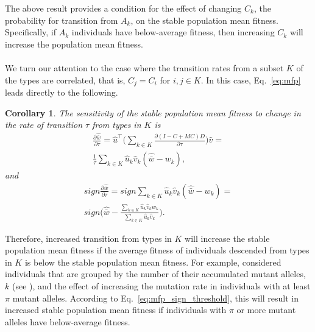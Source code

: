 \documentclass[9pt, a4paper, twocolumn]{extarticle}
\newcommand*{\tr}{^\intercal}
\newtheorem{corollary}{Corollary}
\begin{document}
The above result provides a condition for the effect of changing $C_k$, the probability for transition from $A_k$, on the stable population mean fitness.
Specifically, if $A_k$ individuals have below-average fitness, then increasing $C_k$ will increase the population mean fitness.

\paragraph*{}
We turn our attention to the case where the transition rates from a subset $K$ of the types are correlated, that is, $C_j=C_i$ for $i,j \in K$.
In this case, Eq.~\ref{eq:mfp} leads directly to the following.

\begin{corollary}
The sensitivity of the stable population mean fitness to change in the rate of transition $\tau$ from types in $K$ is
\begin{equation}\label{eq:mfp_K}
\begin{aligned}
\frac{\partial \hat{\bar w}}{\partial \tau} = 
\hat u\tr \Big( \sum_{k \in K}{\frac{\partial (I - C + MC)D}{\partial \tau}} \Big) \hat v = \\
\frac{1}{\tau} \sum_{k \in K}{\hat u_k \hat v_k (\hat{\bar w} - w_k)},
\end{aligned}
\end{equation}
and
\begin{multline}\label{eq:mfp_sign_threshold}
sign \frac{\partial \hat{\bar w}}{\partial \tau} = 
sign \sum_{k \in K}{\hat u_k \hat v_k (\hat{\bar w} - w_k)} = \\ 
sign \Big(\hat{\bar w} - \frac{\sum_{k \in K}{\hat u_k \hat v_k w_k}}{\sum_{k \in K}{\hat u_k \hat v_k}}\Big).
\end{multline}
\end{corollary}

Therefore, increased transition from types in $K$ will increase the stable population mean fitness if the average fitness of individuals descended from types in $K$ is below the stable population mean fitness.
For example, \citet[Appendix~B]{Ram2012} considered individuals that are grouped by the number of their accumulated mutant alleles, $k$ (see ), 
and the effect of increasing the mutation rate in individuals with at least $\pi$ mutant alleles.
According to Eq.~\ref{eq:mfp_sign_threshold}, this will result in increased stable population mean fitness if individuals with $\pi$ or more mutant alleles have below-average fitness. 
\end{document}
